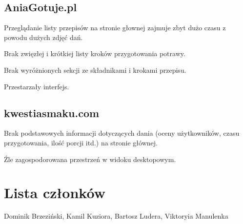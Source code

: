 \documentclass{article}
\newenvironment{itemize.zip}
{ \begin{itemize}
    \setlength{\itemsep}{0pt}
    \setlength{\parskip}{0pt}
    \setlength{\parsep}{0pt}     }
{ \end{itemize}                  }
\begin{document}
\subsection{AniaGotuje.pl}
\begin{itemize.zip}
    \item Przeglądanie listy przepisów na stronie głownej zajmuje zbyt dużo czasu z powodu dużych zdjęć dań.
    \item Brak zwięzłej i krótkiej listy kroków przygotowania potrawy.
    \item Brak wyróżnionych sekcji ze składnikami i krokami przepisu.
    \item Przestarzały interfejs.
\end{itemize.zip}
\subsection{kwestiasmaku.com}
\begin{itemize.zip}
    \item Brak podstawowych informacji dotyczących dania (oceny użytkowników, czasu przygotowania, ilość porcji itd.) na stronie głównej.
    \item Źle zagospodorowana przestrzeń w widoku desktopowym.
\end{itemize.zip}
\section{Lista członków}
    Dominik Brzeziński, Kamil Kuziora, Bartosz Ludera, Viktoryia Manulenka
\end{document}
